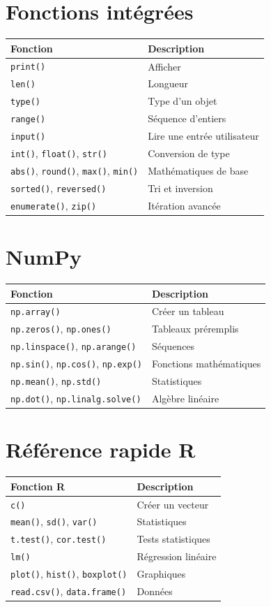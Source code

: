 \documentclass[12pt,a4paper,twoside]{book}
\theoremstyle{definition}
\theoremstyle{remark}
\newcommand{\py}[1]{\texttt{#1}}
\newcommand{\ri}[1]{\texttt{#1}}
\begin{document}
\section{Fonctions int\'egr\'ees}
\begin{tabular}{ll}
\toprule
\textbf{Fonction} & \textbf{Description} \\
\midrule
\py{print()} & Afficher \\
\py{len()} & Longueur \\
\py{type()} & Type d'un objet \\
\py{range()} & S\'equence d'entiers \\
\py{input()} & Lire une entr\'ee utilisateur \\
\py{int()}, \py{float()}, \py{str()} & Conversion de type \\
\py{abs()}, \py{round()}, \py{max()}, \py{min()} & Math\'ematiques de base \\
\py{sorted()}, \py{reversed()} & Tri et inversion \\
\py{enumerate()}, \py{zip()} & It\'eration avanc\'ee \\
\bottomrule
\end{tabular}

\section{NumPy}
\begin{tabular}{ll}
\toprule
\textbf{Fonction} & \textbf{Description} \\
\midrule
\py{np.array()} & Cr\'eer un tableau \\
\py{np.zeros()}, \py{np.ones()} & Tableaux pr\'eremplis \\
\py{np.linspace()}, \py{np.arange()} & S\'equences \\
\py{np.sin()}, \py{np.cos()}, \py{np.exp()} & Fonctions math\'ematiques \\
\py{np.mean()}, \py{np.std()} & Statistiques \\
\py{np.dot()}, \py{np.linalg.solve()} & Alg\`ebre lin\'eaire \\
\bottomrule
\end{tabular}

\section{R\'ef\'erence rapide R}
\begin{tabular}{ll}
\toprule
\textbf{Fonction R} & \textbf{Description} \\
\midrule
\ri{c()} & Cr\'eer un vecteur \\
\ri{mean()}, \ri{sd()}, \ri{var()} & Statistiques \\
\ri{t.test()}, \ri{cor.test()} & Tests statistiques \\
\ri{lm()} & R\'egression lin\'eaire \\
\ri{plot()}, \ri{hist()}, \ri{boxplot()} & Graphiques \\
\ri{read.csv()}, \ri{data.frame()} & Donn\'ees \\
\bottomrule
\end{tabular}
\end{document}
